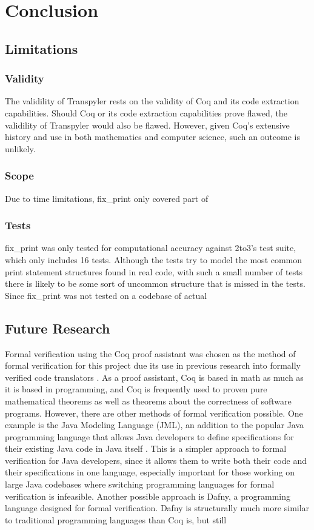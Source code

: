 \section{Conclusion}
\subsection{Limitations}

\subsubsection{Validity}
The validility of Transpyler rests on the validity of Coq and its code extraction capabilities. Should Coq or its code extraction capabilities prove flawed, the validility of Transpyler would also be flawed. However, given Coq's extensive history and use in both mathematics and computer science, such an outcome is unlikely.

\subsubsection{Scope}
Due to time limitations, fix\_print only covered part of 

\subsubsection{Tests}
fix\_print was only tested for computational accuracy against 2to3's test suite, which only includes 16 tests. Although the tests try to model the most common print statement structures found in real code, with such a small number of tests there is likely to be some sort of uncommon structure that is missed in the tests. Since fix\_print was not tested on a codebase of actual

\subsection{Future Research}
Formal verification using the Coq proof assistant was chosen as the method of formal verification for this project due its use in previous research into formally verified code translators \autocite{Leroy}\autocite{Zhao}. As a proof assistant, Coq is based in math as much as it is based in programming, and Coq is frequently used to proven pure mathematical theorems as well as theorems about the correctness of software programs. However, there are other methods of formal verification possible. One example is the Java Modeling Language (JML), an addition to the popular Java programming language that allows Java developers to define specifications for their existing Java code in Java itself \autocite{Burdy}. This is a simpler approach to formal verification for Java developers, since it allows them to write both their code and their specifications in one language, especially important for those working on large Java codebases where switching programming languages for formal verification is infeasible. Another possible approach is Dafny, a programming language designed for formal verification. Dafny is structurally much more similar to traditional programming languages than Coq is, but still 